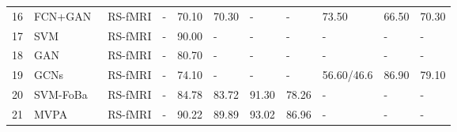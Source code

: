 \begin{table*}
\begin{tabular}{l|l|l|l|lllllll}
16                                      & FCN+GAN~\cite{2020Functional}           & RS-fMRI                                            & -                                            & 70.10                        & 70.30                        & -                             & -                          & 73.50                           & 66.50                           & 70.30                   \\
17                                      & SVM~\cite{2013Identifying}             & RS-fMRI                                            & -                                            & 90.00                        & -                            & -                             & -                          & -                               & -                               & -                       \\
18                                     & GAN~\cite{2020Functional}                     & RS-fMRI                                            & -                                            & 80.70                        & -                            & -                             & -                          & -                               & -                               & -                       \\
19                                      & GCNs~\cite{2020Identifying}                   & RS-fMRI                                            & -                                            & 74.10                        & -                            & -                             & -                          & 56.60/46.6                      & 86.90                           & 79.10                   \\
20                                      &SVM-FoBa~\cite{Nan-Feng}                  & RS-fMRI                                            & -                                            & 84.78                        & 83.72                        & 91.30                         & 78.26                      & -                               & -                               & -                       \\
21                                     & MVPA~\cite{8575800}                    & RS-fMRI                                            & -                                            & 90.22                        & 89.89                        & 93.02                         & 86.96                      & -                               & -                               & -                       \\

\end{tabular}
\end{table*}
